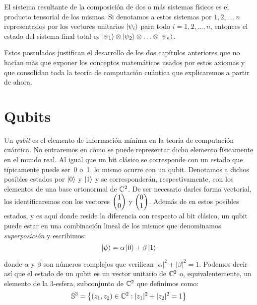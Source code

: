 \begin{postulate} El sistema resultante de la composición de dos o más sistemas físicos es el producto tensorial de los mismos. Si denotamos a estos sistemas por $1,2,...,n$ representados por los vectores unitarios $\left|\psi_i\right\rangle$ para todo $i=1,2,...,n$, entonces el estado del sistema final total es $\left|\psi_1\right\rangle\otimes\left|\psi_2\right\rangle\otimes\hdots\otimes\left|\psi_n\right\rangle$.

Estos postulados justifican el desarrollo de los dos capítulos anteriores que no hacían más que exponer los conceptos matemáticos usados por estos axiomas y que consolidan toda la teoría de computación cuántica que explicaremos a partir de ahora.
\end{postulate}

\section{Qubits}
\label{sec:sec43}

Un \textit{qubit}  es el elemento de información mínima en la teoría de computación cuántica. No entraremos en cómo se puede representar dicho elemento físicamente en el mundo real. Al igual que un bit clásico se corresponde con un estado que típicamente puede ser~0 o~1, lo mismo ocurre con un qubit. Denotamos a dichos posibles estados por $\left|0\right\rangle$ y $\left|1\right\rangle$ y se corresponderán, respectivamente, con los elementos de una base ortonormal de $\mathbb{C}^2$. De ser necesario darles forma vectorial, los identificaremos con los vectores $\begin{pmatrix} 1 \\ 0 \end{pmatrix}$ y $\begin{pmatrix} 0 \\ 1 \end{pmatrix}$. Además de en estos posibles estados, y es aquí donde reside la diferencia con respecto al bit clásico, un qubit puede estar en una combinación lineal de los mismos que denominamos \textit{superposición} y escribimos:
\[\left|\psi\right\rangle=\alpha\left|0\right\rangle+\beta\left|1\right\rangle\]

\noindent donde $\alpha$ y $\beta$ son números complejos que verifican $|\alpha|^2+|\beta|^2=1$. Podemos decir así que el estado de un qubit es un vector unitario de $\mathbb{C}^2$ o, equivalentemente, un elemento de la 3-esfera, subconjunto de $\mathbb{C}^2$ que definimos como:
\[\mathbb{S}^3=\left\{ (z_1,z_2)\in\mathbb{C}^2:|z_1|^2+|z_2|^2=1 \right\}\]

